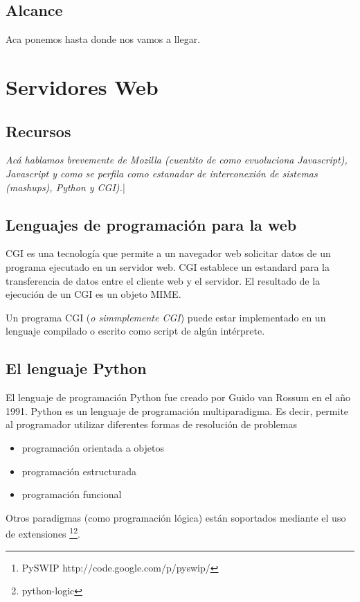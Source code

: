 \documentclass[a4paper]{report}
\begin{document}
\section{Alcance}

Aca ponemos hasta donde nos vamos a llegar.

\chapter{Servidores Web}

\section{Recursos}
\emph{Acá hablamos brevemente de Mozilla (cuentito de como evuoluciona
Javascript), Javascript y como se 
perfila como estanadar de interconexión de sistemas (mashups), Python y CGI).}|
 
\section{Lenguajes de programación para la web}
CGI es una tecnología que permite a un navegador web solicitar datos de un
programa ejecutado en un servidor web.
CGI establece un estandard para la transferencia de datos entre el cliente web y
el servidor. El resultado de la ejecución de un CGI es un objeto MIME.

Un programa CGI (\textit{o simmplemente CGI}) puede estar implementado en un
lenguaje compilado o escrito como script de algún intérprete.


\section{El lenguaje Python}
\label{lang:python}
El lenguaje de programación Python fue creado por Guido van Rossum en el año
1991.
Python es un lenguaje de programación multiparadigma. Es decir, permite al 
programador utilizar diferentes formas de resolución de problemas
\begin{itemize}
 \item {programación orientada a objetos}
 \item {programación estructurada}
 \item {programación funcional}
\end{itemize}
Otros paradigmas (como programación lógica) están soportados mediante el uso de
extensiones
\footnote{PySWIP http://code.google.com/p/pyswip/}\footnote{python-logic}.
\end{document}
